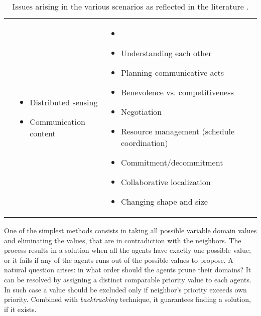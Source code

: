 \documentclass[../header]{subfiles}
\begin{document}
\begin{table}
\begin{tabular}{P{0.1\textwidth} P{0.3\textwidth}|P{0.4\textwidth}}
                      & \begin{minipage}{0.3\textwidth}
                        \footnotesize\begin{itemize}[leftmargin=5px, rightmargin=0px]
                          \item Distributed sensing
                          \item Communication content
                        \end{itemize}\end{minipage}
                      & \begin{minipage}{0.4\textwidth}
                        \footnotesize\begin{itemize}[leftmargin=10px, rightmargin=0px]
                          \item[]
                          \item Understanding each other
                          \item Planning communicative acts
                          \item Benevolence vs. competitiveness
                          \item Negotiation
                          \item Resource management (schedule coordination)
                          \item Commitment/decommitment
                          \item Collaborative localization
                          \item Changing shape and size
                        \end{itemize}\end{minipage}
  \end{tabular}
  \caption[Issues arising in the various scenarios as reflected in the literature]
          {Issues arising in the various scenarios as reflected in the literature
          \cite[Table~2]{MAS-Survey}.}
  \label{table:MAS-Table}
\end{table}




\bigskip
One of the simplest methods consists in taking all possible variable domain values
and eliminating the values, that are in contradiction with the neighbors.
The process results in a solution when all the agents have exactly one
possible value; or it fails if any of the agents runs out of the possible
values to propose. A natural question arises: in what order should the agents
prune their domains?
It can be resolved by assigning a distinct comparable priority value to each agents.
In such case a value should be excluded only if neighbor's priority exceeds own priority.
Combined with \emph{backtracking} technique, it guarantees finding a solution,
if it exists.
\end{document}

